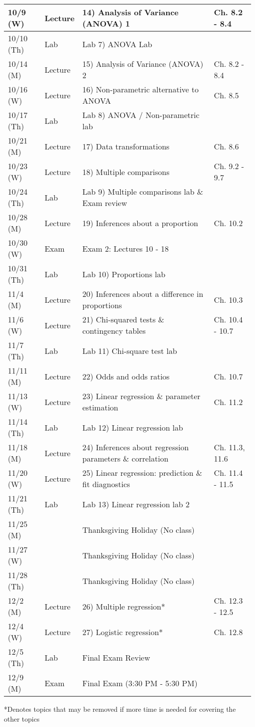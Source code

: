 \documentclass{article}
\begin{document}
\begin{center}
\begin{tabular}{|p{2cm}|p{1.5cm}|p{9cm}|p{2.8cm}|}
		10/9 (W) & Lecture & 14) Analysis of Variance (ANOVA) 1 & Ch. 8.2 - 8.4 \\ \hline
		10/10 (Th) & Lab & Lab 7) ANOVA Lab & \\ \hline
		10/14 (M) & Lecture & 15) Analysis of Variance (ANOVA) 2 & Ch. 8.2 - 8.4 \\ \hline
		10/16 (W) & Lecture & 16) Non-parametric alternative to ANOVA & Ch. 8.5 \\ \hline
		10/17 (Th) & Lab & Lab 8) ANOVA / Non-parametric lab  & \\ \hline
		10/21 (M) & Lecture & 17) Data transformations & Ch. 8.6 \\ \hline
		10/23 (W) & Lecture & 18) Multiple comparisons & Ch. 9.2 - 9.7 \\ \hline
		10/24 (Th) & Lab & Lab 9) Multiple comparisons lab \& Exam review & \\ \hline
		10/28 (M) & Lecture & 19) Inferences about a proportion & Ch. 10.2 \\ \hline
		10/30 (W) & Exam & Exam 2: Lectures 10 - 18 & \\ \hline
		10/31 (Th) & Lab & Lab 10) Proportions lab & \\ \hline
		11/4 (M) & Lecture & 20) Inferences about a difference in proportions & Ch. 10.3 \\ \hline
		11/6 (W) & Lecture & 21) Chi-squared tests \& contingency tables & Ch. 10.4 - 10.7 \\ \hline
		11/7 (Th) & Lab & Lab 11) Chi-square test lab & \\ \hline
		11/11 (M) & Lecture & 22) Odds and odds ratios & Ch. 10.7 \\ \hline
		11/13 (W) & Lecture & 23) Linear regression \& parameter estimation & Ch. 11.2 \\ \hline
		11/14 (Th) & Lab & Lab 12) Linear regression lab & \\ \hline
		11/18 (M) & Lecture & 24) Inferences about regression parameters \& correlation  & Ch. 11.3, 11.6 \\ \hline
		11/20 (W) & Lecture & 25) Linear regression: prediction \& fit diagnostics & Ch. 11.4 - 11.5 \\ \hline
		11/21 (Th) & Lab & Lab 13) Linear regression lab 2 & \\ \hline
		11/25 (M) & & Thanksgiving Holiday (No class) & \\ \hline
		11/27 (W) & & Thanksgiving Holiday (No class) & \\ \hline
		11/28 (Th) & & Thanksgiving Holiday (No class) & \\ \hline
		12/2 (M) & Lecture & 26) Multiple regression* & Ch. 12.3 - 12.5\\ \hline
		12/4 (W) & Lecture & 27) Logistic regression* & Ch. 12.8 \\ \hline
		12/5 (Th) & Lab & Final Exam Review & \\ \hline
		12/9 (M) & Exam &  Final Exam (3:30 PM - 5:30 PM) & \\ \hline
	\end{tabular}
\end{center}
*Denotes topics that may be removed if more time is needed for covering the other topics
\end{document}
